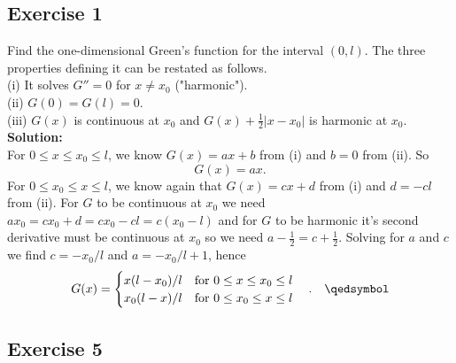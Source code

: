\documentclass[12pt]{article}%
\begin{document}
\subsection*{Exercise 1}
Find the one-dimensional Green's function for the interval $(0,l)$. The three
properties defining it can be restated as follows.\\
(i) It solves $G''=0$ for $x\neq x_0$ ("harmonic").\\
(ii) $G(0)=G(l)=0$.\\
(iii) $G(x)$ is continuous at $x_0$ and $G(x)+\frac{1}{2}|x-x_0|$ is harmonic at $x_0$.\\
\textbf{Solution:}\\
For $0\leq x \leq x_0\leq l$, we know $G(x)=ax+b$ from (i) and $b=0$ from (ii). So
\[
G(x)=ax.
\]
For $0\leq x_0\leq x\leq l$, we know again that $G(x)=cx+d$ from
(i) and $d=-cl$ from (ii). For $G$ to be continuous at $x_0$ we
need $ax_0=cx_0+d=cx_0-cl=c(x_0-l)$ and for $G$ to be harmonic it's second
derivative must be continuous at $x_0$ so we need $a-\frac{1}{2}=c+\frac{1}{2}$. Solving for $a$ and $c$ we find $c=-x_0/l$ and $a=-x_0/l+1$, hence
\[
    G(x) =\begin{cases}
        x(l-x_0)/l \quad \text{for } 0\leq x\leq x_0 \leq l\\
        x_0(l-x)/l \quad \text{for } 0\leq x_0\leq x \leq l
    \end{cases}. \quad \qedsymbol
\]
\subsection*{Exercise 5}
\end{document}
